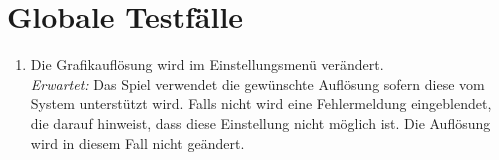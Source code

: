 \chapter{Globale Testfälle}

\renewcommand{\theenumi}{/T\_\arabic{enumi}0/}
\renewcommand{\labelenumi}{\theenumi}

\begin{enumerate}
\item Die Grafikauflösung wird im Einstellungsmenü verändert.\\
	 	\textit{Erwartet:} Das Spiel verwendet die gewünschte Auflösung sofern diese vom System unterstützt wird. Falls nicht wird eine Fehlermeldung eingeblendet, die darauf hinweist, dass diese Einstellung nicht möglich ist. Die Auflösung wird in diesem Fall nicht geändert.
	 	

\end{enumerate}
